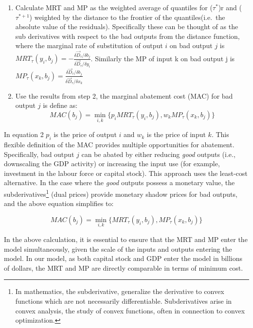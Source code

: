 \documentclass[
  10pt,
]{article}
\begin{document}
\begin{enumerate}
\def\labelenumi{\arabic{enumi}.}
\setcounter{enumi}{1}
\item
  Calculate MRT and MP as the weighted average of quantiles for
  (\(\tau^{*}\))r and (\(\tau^{*+1}\)) weighted by the distance to the
  frontier of the quantiles(i.e.~the absolute value of the residuals).
  Specifically these can be thought of as the sub derivatives with
  respect to the bad outputs from the distance function, where the
  marginal rate of substitution of output \(i\) on bad output \(j\) is
  \(MRT_{\tau}(y_{i},b_{j})=-\frac{\delta \vec{D}_{\tau}/\delta b_{j}}{\delta \vec{D}_{\tau}/\delta y_{i}}\).
  Similarly the MP of input k on bad output j is
  \(MP_{\tau}(x_{k},b_{j})=\frac{\delta \vec{D}_{\tau}/\delta b_{j}}{\delta \vec{D}_{\tau}/\delta x_{k}}\)
\item
  Use the results from step 2, the marginal abatement cost (MAC) for bad
  output \(j\) is define as: \begin{equation}
  MAC(b_{j})=\displaystyle \min_{i,k}\{p_{i}MRT_{\tau}(y_{i},b_{j}), w_{k}MP_{\tau}(x_{k},b_{j})\}
  \end{equation}
\end{enumerate}

In equation 2 \(p_{i}\) is the price of output \(i\) and \(w_{k}\) is
the price of input \(k\). This flexible definition of the MAC provides
multiple opportunities for abatement. Specifically, bad output \(j\) can
be abated by either reducing \emph{good} outputs (i.e., downscaling the
GDP activity) or increasing the input use (for example, investment in
the labour force or capital stock). This approach uses the least-cost
alternative. In the case where the \emph{good} outputs possess a
monetary value, the subderivatives\footnote{In mathematics, the subderivative, generalize the derivative to convex functions which are not necessarily differentiable. Subderivatives arise in convex analysis, the study of convex functions, often in connection to convex optimization.} (dual prices) provide monetary
shadow prices for bad outputs, and the above equation simplifies to:

\begin{equation}
MAC(b_{j})=\displaystyle \min_{i,k}\{MRT_{\tau}(y_{i},b_{j}), MP_{\tau}(x_{k},b_{j})\} 
\end{equation}

In the above calculation, it is essential to ensure that the MRT and MP
enter the model simultaneously, given the scale of the inputs and
outputs entering the model. In our model, as both capital stock and GDP
enter the model in billions of dollars, the MRT and MP are directly
comparable in terms of minimum cost.
\end{document}

